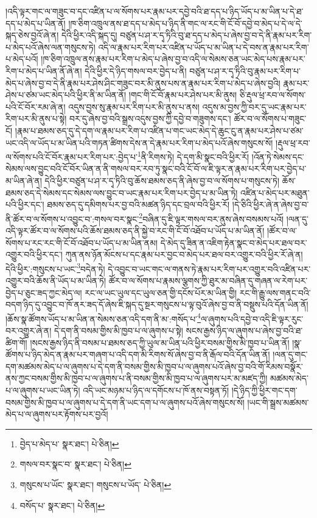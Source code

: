 །འདི་ལྟར་གང་ལ་གཟུང་བ་དང་འཛིན་པ་ལ་སོགས་པར་རྣམ་པར་དབྱེ་བའི་ཐ་དད་པ་ཉིད་ཡོད་པ་མ་ཡིན་པ་དེ་ཐ་དད་པ་མེད་པ་ཡིན་ནོ། །ཁ་ཅིག་འཁྲུལ་ནས་ཐ་དད་པ་མེད་པ་ཉིད་ནི་གང་ལ་རང་གི་ངོ་བོ་དབྱེ་བ་མེད་པ་དེ་ལ་དེ་སྐད་ཅེས་བྱའོ་ཞེ་ན། དེའི་ཕྱིར་འདི་སྐད་དུ། བཙུན་པ་ཤ་ར་དྭ་ཏིའི་བུ་ཐ་དད་པ་མེད་པ་ཞེས་བྱ་བ་དེ་ནི་རྣམ་པར་རིག་པ་མེད་པའོ་ཞེས་ལན་གསུངས་ཏེ། འདི་ལ་རྣམ་པར་རིག་པར་འཛིན་པ་ཡོད་པ་མ་ཡིན་པ་དེ་བས་ན་རྣམ་པར་རིག་པ་མེད་པའོ། །ཁ་ཅིག་འཁྲུལ་ནས་རྣམ་པར་རིག་པ་མེད་པ་ཞེས་བྱ་བ་འདི་ལ་སེམས་ཅན་ཡང་མེད་པས་རྣམ་པར་རིག་པ་མེད་པ་ཡིན་ནོ་ཞེ་ན། དེའི་ཕྱིར་དེ་ཉིད་གསལ་བར་བྱེད་པ་ནི། བཙུན་པ་ཤ་ར་དྭ་ཏིའི་བུ་རྣམ་པར་རིག་པ་མེད་པ་ཞེས་བྱ་བ་དེ་ནི་རྣམ་པར་ཤེས་ཤིང་གཟུང་བར་མི་ནུས་པས་ན་རྣམ་པར་རིག་པ་མེད་པ་ཞེས་བྱའི། རྣམ་པར་ཤེས་པ་ཙམ་ཡང་མེད་པའི་ཕྱིར་ནི་མ་ཡིན་ནོ། །གང་གི་ངོ་བོ་རྣམ་པར་ཤེས་པར་མི་ནུས། ཅི་རྡུལ་ཕྲ་རབ་ལ་སོགས་པའི་ངོ་བོར་རམ་ཞེ་ན། འདུས་བྱས་སུ་རྣམ་པར་རིག་པར་མི་ནུས་པ་ནས། འདུས་མ་བྱས་ཀྱི་བར་དུ་ཡང་རྣམ་པར་རིག་པར་མི་ནུས་པ་སྟེ། བར་དུ་ཞེས་བྱ་བའི་སྒྲས་འདུས་བྱས་ཀྱི་དབྱེ་བ་གཟུགས་དང་། ཚོར་བ་ལ་སོགས་པ་གཟུང་ངོ། །རྣམ་པ་ཐམས་ཅད་དུ་དེ་དག་ལ་རྣམ་པར་རིག་པ་འཛིན་པ་གང་ཡང་མེད་དེ་ཆུང་ངུ་ན་རྣམ་པར་ཤེས་པ་ཙམ་ཡང་འདི་ལ་ཡོད་པ་མ་ཡིན་པའི་གཏན་ཚིགས་དེས་ན་དེ་རྣམ་པར་རིག་པ་མེད་པའོ་ཞེས་གསུངས་སོ། །རྡུལ་ཕྲ་རབ་ལ་སོགས་པའི་ངོ་བོར་རྣམ་པར་རིག་པར་:བྱེད་པ་\footnote{བྱེད་པ་མེད་པ་  སྣར་ཐང་།  པེ་ཅིན། }ནི་རིགས་ཏེ། དེ་དག་མི་སྣང་བའི་ཕྱིར་རོ། །འོན་ཏེ་སེམས་དང་སེམས་ལས་བྱུང་བའི་ངོ་བོར་ཡིན་ན་ནི་གསལ་བར་རབ་ཏུ་སྣང་བའི་ངོ་བོ་ལ་ཇི་ལྟར་ན་རྣམ་པར་རིག་པར་བྱེད་པ་མ་ཡིན་ཞེ་ན། དེའི་ཕྱིར་བཙུན་པ་ཤ་ར་དྭ་ཏིའི་བུ་ཆོས་ཐམས་ཅད་ནི་ཞེས་བྱ་བ་ལ་སོགས་པ་གསུངས་ཏེ། ཆོས་ཐམས་ཅད་དེ་སེམས་དང་སེམས་ལས་བྱུང་བ་ཡང་རྣམ་པར་རིག་པར་བྱེད་པ་མ་ཡིན་ཏེ། འཛིན་པ་མེད་པར་མཐུན་པའི་ཕྱིར་དང་། ཐམས་ཅད་དུ་དམིགས་པར་བྱ་བའི་མཚན་ཉིད་དང་བྲལ་བའི་ཕྱིར་རོ། །དེ་ཅིའི་ཕྱིར་ཞེ་ན་ཞེས་བྱ་བ་ནི་ཚོར་བ་ལ་སོགས་པ་འབྱུང་བ་:གསལ་བར་སྣང་\footnote{གསལ་བར་སྣང་བ་  སྣར་ཐང་།  པེ་ཅིན། }བཞིན་དུ་ཇི་ལྟར་གསལ་བར་ནུས་ཞེས་བསམས་པའོ། །ལན་དུ་འདི་ལྟར་ཚོར་བ་ལ་སོགས་པའི་ཆོས་ཐམས་ཅད་ནི་སྐྱེ་བ་རང་གི་ངོ་བོ་འཐོབ་པ་ཡོད་པ་མ་ཡིན་ནོ། །ཚོར་བ་ལ་སོགས་པ་རང་རང་གི་ངོ་བོ་འཐོབ་པ་ཡོད་པ་མ་ཡིན་ནམ། དེ་མེད་དུ་ཟིན་ན་འཇིག་རྟེན་སྣང་བ་མེད་པར་ཐལ་བར་འགྱུར་བའི་ཕྱིར་དང་། ཀུན་ནས་ཉོན་མོངས་པ་དང་རྣམ་པར་བྱང་བ་མེད་པར་ཐལ་བར་འགྱུར་བའི་ཕྱིར་རོ་ཞེ་ན། དེའི་ཕྱིར་:གསུངས་པ་ཡང་\footnote{གསུངས་པ་ཡོང་  སྣར་ཐང་། གསུངས་པ་ཡོད་  པེ་ཅིན། }བདེན་ཏེ། དེ་འབྱུང་བ་ཡང་གང་ལ་གནས་ཏེ་རྣམ་པར་རིག་པར་འགྱུར་བའི་འཛིན་པར་འགྱུར་བའི་ཆོས་ནི་ཡོད་པ་མ་ཡིན་ཏེ། ཚོར་བ་ལ་སོགས་པ་རྣམས་ལྕགས་ཀྱི་ཐུར་མ་བཞིན་དུ་གཞན་ལ་རེག་པར་བྱེད་པ་ཅུང་ཟད་ཀྱང་མེད་ལ། རང་ལ་ཡང་ཡུལ་དང་ཡུལ་ཅན་གྱི་དངོས་པོར་མ་ཡིན་གྱི། རང་གི་རྒྱུ་ལས་གནང་བའི་བདག་ཉིད་དུ་འབྱུང་བ་ཁོ་ནར་ཟད་དོ་ཞེས་ཇི་སྐད་དུ་སྔར་གསུངས་པ་ལྟ་བུའོ་ཞེས་བྱ་བ་ནི་བསྡུས་པའི་དོན་ཡིན་ནོ། །ཆོས་སྣ་ཚོགས་ཡོད་པ་མ་ཡིན་ན་སེམས་ཅན་འདི་དག་ནི་མ་:གསོད་པ་\footnote{བསོད་པ་  སྣར་ཐང་།  པེ་ཅིན། }ལ་ཞུགས་པའི་དབྱེ་བ་འདི་ཇི་ལྟར་རུང་བར་འགྱུར་ཞེ་ན། དེ་དག་ནི་བསམ་གྱིས་མི་ཁྱབ་པ་ལ་ཞུགས་པ་སྟེ། སངས་རྒྱས་ཉིད་ལ་ཞུགས་པ་ཞེས་བྱ་བའི་ཐ་ཚིག་གོ། །སངས་རྒྱས་ཉིད་ནི་བསམ་པ་ཐམས་ཅད་ཀྱི་ཡུལ་མ་ཡིན་པའི་ཕྱིར་བསམ་གྱིས་མི་ཁྱབ་པ་ཡིན་ནོ། །སྣ་ཚོགས་པ་ཉིད་མེད་ན་རྣམ་པར་གཞག་པ་འདི་དག་མི་རིགས་སོ་ཞེས་བྱ་བ་ནི་རྒོལ་བའི་དོན་ཡིན་ནོ། །ལན་དུ་གང་དག་མཚམས་མེད་པ་ལ་ཞུགས་པ་དེ་དག་ནི་བསམ་གྱིས་མི་ཁྱབ་པ་ལ་ཞུགས་པའོ་ཞེས་བྱ་བའི་གོ་རིམས་བསྣོར་ནས་ཀྱང་བསམ་གྱིས་མི་ཁྱབ་པ་ལ་ཞུགས་པ་ནི་བསམ་གྱིས་མི་ཁྱབ་པ་ལ་ཞུགས་པར་མ་མཛད་ཀྱི། མཚམས་མེད་པ་ལ་ཞུགས་པ་ཡང་ཡིན་ཏེ། འདི་ཡང་མཉམ་པ་ཉིད་ལ་དགོངས་པ་ཁོ་ནས་བསྟན་ཏོ། །དེ་ཉིད་ཀྱི་ཕྱིར་གང་དག་བསམ་གྱིས་མི་ཁྱབ་པ་ལ་ཞུགས་པ་དེ་དག་ནི་ཡང་དག་པ་ལ་ཞུགས་པའོ་ཞེས་གསུངས་སོ། །ཡང་གི་སྒྲས་མཚམས་མེད་པ་ལ་ཞུགས་པར་རྟོགས་པར་བྱའོ། 
